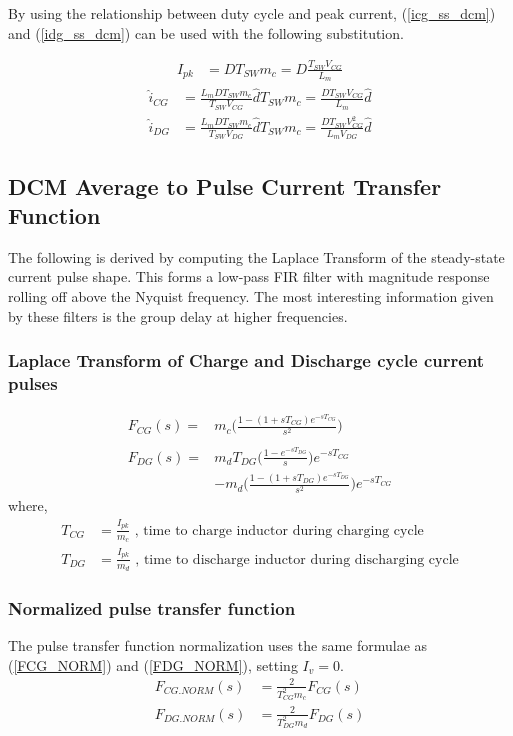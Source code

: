 \documentclass{scrartcl}
\begin{document}
	By using the relationship between duty cycle and peak current, (\ref{icg_ss_dcm}) and (\ref{idg_ss_dcm}) can be used with the following substitution.
	
	\begin{align}
		I_{pk} &= D T_{SW} m_c = D \frac{T_{SW} V_{CG}}{L_m}
	\end{align}
	\begin{align}
	\hat i_{CG} &= \frac{L_m D T_{SW} m_c}{T_{SW}V_{CG}}  \hat d T_{SW} m_c = \frac{ D T_{SW} V_{CG}}{L_m} \hat d \\
	\hat i_{DG} &= \frac{L_m D T_{SW} m_c}{T_{SW}V_{DG}} \hat d T_{SW} m_c = \frac{ D T_{SW} V_{CG}^2}{L_m V_{DG}} \hat d
	\end{align}
	
\subsection{DCM Average to Pulse Current Transfer Function}	
The following is derived by computing the Laplace Transform of the steady-state current pulse shape.  This forms a low-pass FIR filter with magnitude response rolling off above the Nyquist frequency.  The most interesting information given by these filters is the group delay at higher frequencies.

\subsubsection{Laplace Transform of Charge and Discharge cycle current pulses}	

\begin{align}
F_{CG}(s) =&   m_c\bigg( \frac{1 - (1 + sT_{CG})e^{-sT_{CG}}}{s^2} \bigg)
\label{icg_IR_laplace_dcm} \\
\nonumber\\
F_{DG}(s) =&  m_d T_{DG} \bigg( \frac{1 - e^{-sT_{DG}}}{s} \bigg)  e^{-sT_{CG}}\nonumber\\
&- m_d \bigg( \frac{1 - (1 + sT_{DG})e^{-sT_{DG}}}{s^2} \bigg)  e^{-sT_{CG}}
\label{idg_IR_laplace_dcm}
\end{align}
where,
\begin{align}
	T_{CG} &= \frac{I_{pk}} {m_c} \text{ , time to charge inductor during charging cycle}\\
	T_{DG} &= \frac{I_{pk}} {m_d} \text{ , time to discharge inductor during discharging cycle}
\end{align}
	
		\subsubsection{Normalized pulse transfer function}
		The pulse transfer function normalization uses the same formulae as (\ref{FCG_NORM}) and (\ref{FDG_NORM}), setting $I_v=0$.
		\begin{align}
		F_{CG.NORM}(s) &= \frac{2}{T_{CG}^2m_c } F_{CG}(s)\label{FCG_NORM_DCM} \\
		F_{DG.NORM}(s) &= \frac{2}{T_{DG}^2m_d }F_{DG}(s) \label{FCG_NORM_DCM}
		\end{align}
\end{document}
